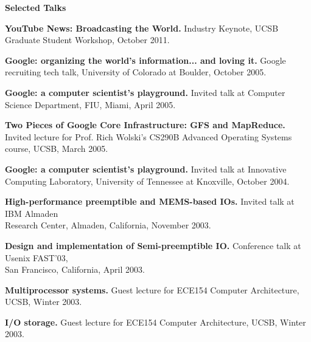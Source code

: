 \documentclass[10pt]{article}
\renewcommand{\section}[1]{ \vspace{10pt}\begin{flushleft}{\hspace{-0.2in }\Large\bf
    #1}\end{flushleft}\nopagebreak }
\begin{document}
\section{Selected Talks}
\vspace{-6pt}
\begin{thebibliography}{22.}

{\bf YouTube News: Broadcasting the World.} 
Industry Keynote, UCSB Graduate Student Workshop, October 2011.

{\bf Google: organizing the world's information... and loving it.} Google
recruiting tech talk, University of Colorado at Boulder, October
2005.

{\bf Google: a computer scientist's playground.} Invited talk at 
Computer Science Department, FIU, Miami, April 2005.

{\bf Two Pieces of Google Core Infrastructure: GFS and MapReduce.} 
Invited lecture for Prof. Rich Wolski's CS290B Advanced Operating Systems 
course, UCSB, March 2005.


{\bf Google: a computer scientist's playground.} Invited talk at 
Innovative Computing Laboratory, University of Tennessee at Knoxville, October 2004.

{\bf High-performance preemptible and MEMS-based IOs.} Invited talk at 
IBM Almaden \\Research Center, Almaden, California, November 2003.


{\bf Design and implementation of Semi-preemptible IO.} Conference talk at 
Usenix FAST'03, \\San Francisco, California, April 2003.

{\bf Multiprocessor systems.} Guest lecture for 
ECE154 Computer Architecture, UCSB, Winter 2003.

{\bf I/O storage.} Guest lecture for ECE154 Computer Architecture, 
UCSB, Winter 2003.



\end{thebibliography}
\end{document}
